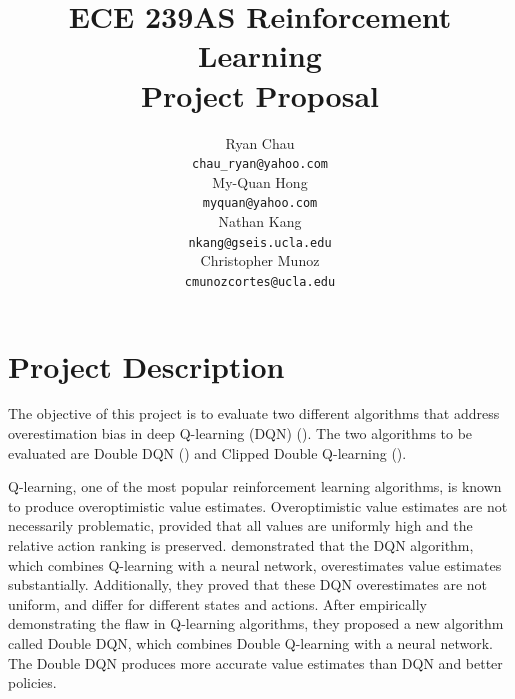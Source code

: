 \documentclass{article}
\title{ECE 239AS Reinforcement Learning\\
       Project Proposal}
\author{%
    Ryan Chau \\
    \texttt{chau\_ryan@yahoo.com}\\
    \And
    My-Quan Hong \\
    \texttt{myquan@yahoo.com} \\
    \And
    Nathan Kang \\
    \texttt{nkang@gseis.ucla.edu} \\
    \And
    Christopher Munoz \\
    \texttt{cmunozcortes@ucla.edu} \\
}
\begin{document}
\maketitle

\section{Project Description}


The objective of this project is to evaluate two different algorithms that
address overestimation bias in deep Q-learning (DQN) (\citet{mnih2015human}).
The two algorithms to be evaluated are Double DQN (\citet{van2016deep}) and Clipped
Double Q-learning (\citet{fujimoto2018addressing}).

Q-learning, one of the most popular reinforcement learning algorithms, is known
to produce overoptimistic value estimates. Overoptimistic value estimates are
not necessarily problematic, provided that all values are uniformly high and the
relative action ranking is preserved.  \citet{van2016deep} demonstrated that the
DQN algorithm, which combines Q-learning with a neural network, overestimates
value estimates substantially.  Additionally, they proved that these DQN
overestimates are not uniform, and differ for different states and actions.
After empirically demonstrating the flaw in Q-learning algorithms, they proposed
a new algorithm called Double DQN, which combines Double Q-learning with a
neural network. The Double DQN produces more accurate value estimates than DQN
and better policies.
\end{document}
